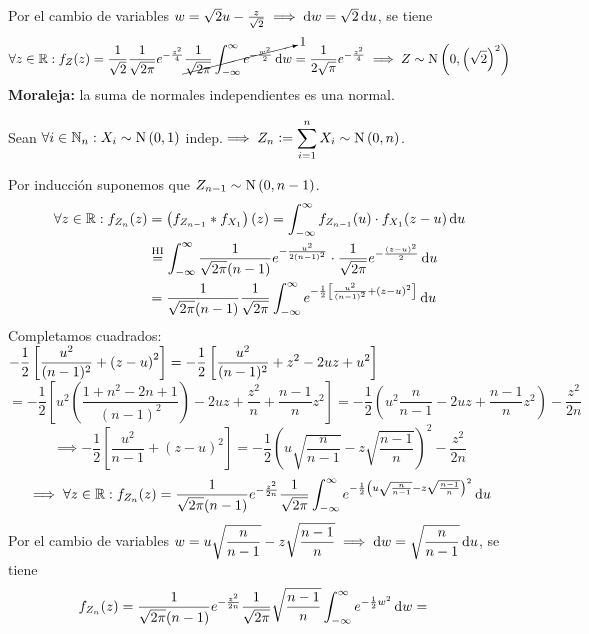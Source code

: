 \begin{ejem}
	Por el cambio de variables $w = \sqrt{2} u - \frac{z}{\sqrt{2}} \implies \odif{w} = \sqrt{2} \odif{u} $, se tiene
	\[\forall z \in \R : f_Z(z) = \frac{1}{\sqrt{2}} \frac{1}{\sqrt{2\pi}} e^{-\frac{z^2}{4}} \cancelto{1}{\frac{1}{\sqrt{2\pi}} \int_{-\infty}^{\infty} e^{-\frac{w^2}{2}} \odif{w}} = \frac{1}{2\sqrt{\pi}} e^{-\frac{z^2}{4}} \implies Z \sim \normal{0, \left(\sqrt{2}\right)^2}\]
	\textbf{Moraleja:} la suma de normales independientes es una normal.
	\begin{ejer} Sean $\forall i \in \mathbb{N}_n : X_i \sim \operatorname{N}\left(0, 1\right)$ indep.$\implies \displaystyle Z_n \vcentcolon= \sum_{i=1}^{n} X_i \sim \operatorname{N}\left(0, n\right)$.
		\begin{dem}
			Por inducción suponemos que $\displaystyle Z_{n-1} \sim \operatorname{N}\left(0, n-1\right)$.
			\[\begin{aligned}
					\forall z \in \R : f_{Z_n}(z) & = \left(f_{Z_{n-1}} * f_{X_1}\right)(z) = \int_{-\infty}^{\infty} f_{Z_{n-1}}(u) \cdot f_{X_1}(z-u) \odif{u}                                                    \\
					                              & \stackrel{\tex{HI}}{=} \int_{-\infty}^{\infty} \frac{1}{\sqrt{2\pi}(n-1)} e^{-\frac{u^2}{2(n-1)^2}} \cdot \frac{1}{\sqrt{2\pi}} e^{-\frac{(z-u)^2}{2}} \odif{u} \\
					                              & = \frac{1}{\sqrt{2\pi}(n-1)} \frac{1}{\sqrt{2\pi}} \int_{-\infty}^{\infty} e^{-\frac{1}{2}\left[\frac{u^2}{(n-1)^2} + \left(z-u\right)^2\right]} \odif{u}       \\
				\end{aligned}\]
			Completamos cuadrados: $\displaystyle -\frac{1}{2}\left[\frac{u^2}{(n-1)^2} + \left(z-u\right)^2\right] = -\frac{1}{2}\left[\frac{u^2}{(n-1)^2} + z^2 - 2uz + u^2\right]$
			\[= -\frac{1}{2}\left[u^2\left(\frac{1 + n^2 -2n +1}{(n-1)^2}\right) - 2uz + \frac{z^2}{n} + \frac{n-1}{n}z^2\right] = -\frac{1}{2} \left(u^2\frac{n}{n-1} -2uz + \frac{n-1}{n}z^2\right) - \frac{z^2}{2n}\]
			\[\implies -\frac{1}{2}\left[\frac{u^2}{n-1} + \left(z-u\right)^2\right] = -\frac{1}{2} {\left(u\sqrt{\frac{n}{n-1}} - z \sqrt{\frac{n-1}{n}}\right)}^2 - \frac{z^2}{2n}\]
			\[\implies \forall z \in \R : f_{Z_n}(z) = \frac{1}{\sqrt{2\pi} (n-1)} e^{-\frac{z^2}{2n}} \frac{1}{\sqrt{2\pi}} \int_{-\infty}^{\infty} e^{-\frac{1}{2} {\left(u\sqrt{\frac{n}{n-1}} - z \sqrt{\frac{n-1}{n}}\right)}^2} \odif{u}\]
			Por el cambio de variables $\ds w = u\sqrt{\frac{n}{n-1}} - z \sqrt{\frac{n-1}{n}} \implies \odif{w} = \sqrt{\frac{n}{n-1}} \odif{u}$, se tiene
			\[\begin{aligned}
					f_{Z_n}(z) & = \frac{1}{\sqrt{2\pi} (n-1)} e^{-\frac{z^2}{2n}} \frac{1}{\sqrt{2\pi}} \sqrt{\frac{n-1}{n}} \int_{-\infty}^{\infty} e^{-\frac{1}{2} w^2} \odif{w} =
				\end{aligned}\]
		\end{dem}
	\end{ejer}
\end{ejem}

